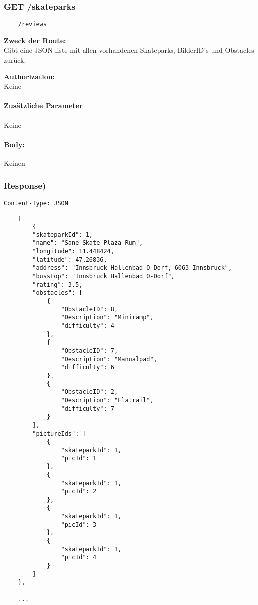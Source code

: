 \label{/skateparks}

\subsubsection{GET /skateparks}

\begin{lstlisting}
    /reviews
\end{lstlisting}

\textbf{Zweck der Route:} \\
Gibt  eine JSON liste mit allen vorhandenen Skateparks,  BilderID's und
Obstacles zurück.

\textbf{Authorization:} \\
Keine

\paragraph{Zusätzliche Parameter}
Keine

\paragraph{Body:}

Keinen

\newpage

\subsubsection{Response)}

\lstinline{Content-Type: JSON}
\begin{lstlisting}
    [
        {
        "skateparkId": 1,
        "name": "Sane Skate Plaza Rum",
        "longitude": 11.448424,
        "latitude": 47.26836,
        "address": "Innsbruck Hallenbad O-Dorf, 6063 Innsbruck",
        "busstop": "Innsbruck Hallenbad O-Dorf",
        "rating": 3.5,
        "obstacles": [
            {
                "ObstacleID": 8,
                "Description": "Miniramp",
                "difficulty": 4
            },
            {
                "ObstacleID": 7,
                "Description": "Manualpad",
                "difficulty": 6
            },
            {
                "ObstacleID": 2,
                "Description": "Flatrail",
                "difficulty": 7
            }
        ],
        "pictureIds": [
            {
                "skateparkId": 1,
                "picId": 1
            },
            {
                "skateparkId": 1,
                "picId": 2
            },
            {
                "skateparkId": 1,
                "picId": 3
            },
            {
                "skateparkId": 1,
                "picId": 4
            }
        ]
    },

    ...
\end{lstlisting}

